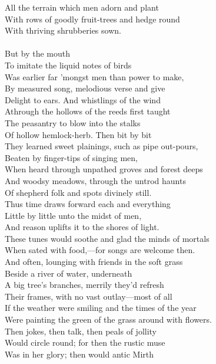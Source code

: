 All the terrain which men adorn and plant\\
With rows of goodly fruit-trees and hedge round\\
With thriving shrubberies sown.\\
\\
But by the mouth\\
To imitate the liquid notes of birds\\
Was earlier far 'mongst men than power to make,\\
By measured song, melodious verse and give\\
Delight to ears. And whistlings of the wind\\
Athrough the hollows of the reeds first taught\\
The peasantry to blow into the stalks\\
Of hollow hemlock-herb. Then bit by bit\\
They learned sweet plainings, such as pipe out-pours,\\
Beaten by finger-tips of singing men,\\
When heard through unpathed groves and forest deeps\\
And woodsy meadows, through the untrod haunts\\
Of shepherd folk and spots divinely still.\\
Thus time draws forward each and everything\\
Little by little unto the midst of men,\\
And reason uplifts it to the shores of light.\\
These tunes would soothe and glad the minds of mortals\\
When sated with food,—for songs are welcome then.\\
And often, lounging with friends in the soft grass\\
Beside a river of water, underneath\\
A big tree's branches, merrily they'd refresh\\
Their frames, with no vast outlay—most of all\\
If the weather were smiling and the times of the year\\
Were painting the green of the grass around with flowers.\\
Then jokes, then talk, then peals of jollity\\
Would circle round; for then the rustic muse\\
Was in her glory; then would antic Mirth\\
